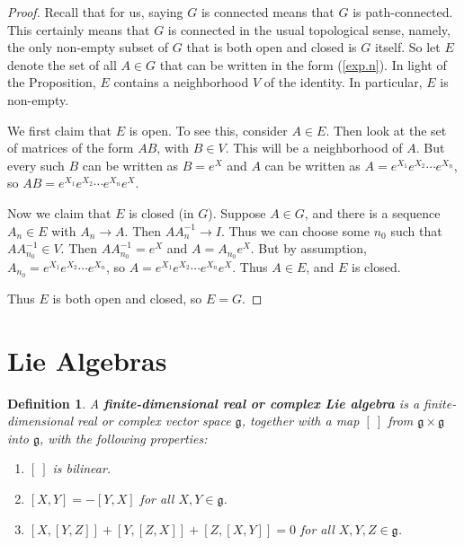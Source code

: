 \documentclass[12pt]{amsbook}
\let \frak = \mathfrak
\theoremstyle{plain}
\newtheorem{definition}[theorem]{Definition}
\numberwithin{equation}{chapter}
\numberwithin{theorem}{chapter}
\begin{document}
\begin{proof}
Recall that for us, saying $G$ is connected means that $G$ is path-connected.
This certainly means that $G$ is connected in the usual topological sense,
namely, the only non-empty subset of $G$ that is both open and closed is $G$
itself. So let $E$ denote the set of all $A\in G$ that can be written in the
form (\ref{exp.n}). In light of the Proposition, $E$ contains a neighborhood
$V$ of the identity. In particular, $E$ is non-empty.

We first claim that $E$ is open. To see this, consider $A\in E$. Then look at
the set of matrices of the form $AB$, with $B\in V$. This will be a
neighborhood of $A$. But every such $B$ can be written as $B=e^{X}$ and $A$
can be written as $A=e^{X_{1}}e^{X_{2}}\cdots e^{X_{n}}$, so $AB=e^{X_{1}%
}e^{X_{2}}\cdots e^{X_{n}}e^{X}$.

Now we claim that $E$ is closed (in $G$). Suppose $A\in G$, and there is a
sequence $A_{n}\in E$ with $A_{n}\rightarrow A$. Then $AA_{n}^{-1}\rightarrow
I$. Thus we can choose some $n_{0}$ such that $AA_{n_{0}}^{-1}\in V$. Then
$AA_{n_{0}}^{-1}=e^{X}$ and $A=A_{n_{0}}e^{X}$. But by assumption, $A_{n_{0}%
}=e^{X_{1}}e^{X_{2}}\cdots e^{X_{n}}$, so $A=e^{X_{1}}e^{X_{2}}\cdots
e^{X_{n}}e^{X}$. Thus $A\in E$, and $E$ is closed.

Thus $E$ is both open and closed, so $E=G$.
\end{proof}

\section{Lie Algebras\label{algebras}}

\begin{definition}
A \textbf{finite-dimensional real or complex Lie algebra} is a
finite-dimensional real or complex vector space $\frak{g}$, together with a
map $\left[  \ \right]  $ from $\frak{g}\times\frak{g}$ into $\frak{g}$, with
the following properties:

\begin{enumerate}
\item $\left[  \ \right]  $ is bilinear.

\item \label{lie.skew}$\left[  X,Y\right]  =-\left[  Y,X\right]  $ for all
$X,Y\in\frak{g}$.

\item \label{jacobi}$\left[  X,\left[  Y,Z\right]  \right]  +\left[  Y,\left[
Z,X\right]  \right]  +\left[  Z,\left[  X,Y\right]  \right]  =0$ for all
$X,Y,Z\in\frak{g}$.
\end{enumerate}
\end{definition}
\end{document}

